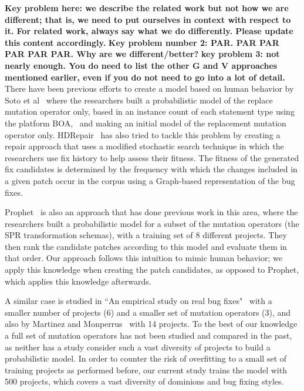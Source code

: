 \documentclass[conference]{IEEEtran}
\newcommand{\todo}[1]
  {{\scriptsize \textbf{\color{red} {#1}}}}
\begin{document}
\todo{Key problem here: we describe the related work but not how we are
  different; that is, we need to put ourselves in context with respect to it.
  For related work, always say what we do differently.  Please update this
  content accordingly.}
\todo{Key problem number 2: PAR.  PAR PAR PAR PAR PAR.  Why are we different/better?}
\todo{key problem 3: not nearly enough.  You do need to list the other G and V approaches mentioned earlier, even if 
you do not need to go into a lot of detail.}
There have been previous efforts to create a model based on human behavior by Soto et al~\cite{Soto15} 
where the researchers built a probabilistic model of the replace mutation 
operator only, based in 
an instance count of each statement type using the platform 
BOA,~\cite{dyer2013} and making an initial model of the replacement mutation 
operator only. HDRepair~\cite{xuan16} has also tried to tackle this problem by 
creating a repair approach that uses a modified stochastic search
technique in which the researchers use fix history
to help assess their fitness. The fitness of the generated
fix candidates is determined by the frequency with which the changes included in a given patch occur in the corpus using a Graph-based representation of the bug fixes.

Prophet~\cite{long16proph} is also an approach that has done previous work in this 
area, where the researchers built a 
probabilistic model for a subset of the mutation operators (the SPR transformation schemas), with a training set 
of 8 different projects. They then rank the candidate patches according to this model and evaluate them in that order. Our approach follows this intuition to mimic human behavior; we apply this knowledge when creating the patch candidates, as opposed to Prophet, which applies this knowledge afterwards. 

A similar case is studied in ``An empirical study on 
real bug fixes"~\cite{zhong15} with a smaller number of projects (6) and a 
smaller set of 
mutation operators (3), and also by Martinez and Monperrus~\cite{martinez15} with 14 
projects. To the best of our knowledge a full set of mutation 
operators has not been studied and compared in the past, as neither has a study 
consider such a vast diversity of projects to build a probabilistic model. In 
order to counter the 
risk of overfitting to a small set of training projects as performed before, our 
current study trains the model with 500 projects, which covers a vast diversity 
of dominions and bug fixing styles.
\end{document}
